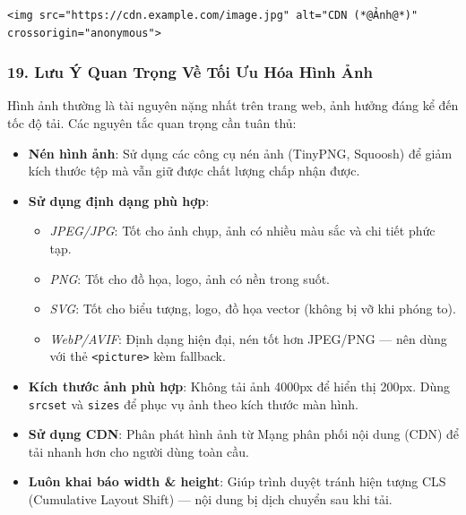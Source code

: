 \documentclass[11pt,oneside]{book}
\newcommand{\codeinline}[1]{\textcolor{accentOrange}{\texttt{#1}}}
\begin{document}
\begin{codeWindow}
\begin{lstlisting}[language=HTML5]
<img src="https://cdn.example.com/image.jpg" alt="CDN (*@Ảnh@*)" crossorigin="anonymous">
\end{lstlisting}
\end{codeWindow}

\subsubsection{19. Lưu Ý Quan Trọng Về Tối Ưu Hóa Hình Ảnh}

Hình ảnh thường là tài nguyên nặng nhất trên trang web, ảnh hưởng đáng kể đến tốc độ tải. Các nguyên tắc quan trọng cần tuân thủ:

\begin{itemize}[leftmargin=1.5em, itemsep=4pt, parsep=0pt]
    \item \textbf{Nén hình ảnh}: Sử dụng các công cụ nén ảnh (TinyPNG, Squoosh) để giảm kích thước tệp mà vẫn giữ được chất lượng chấp nhận được.
    \item \textbf{Sử dụng định dạng phù hợp}:
    \begin{itemize}[leftmargin=1.2em, itemsep=1pt, parsep=0pt]
        \item \textit{JPEG/JPG}: Tốt cho ảnh chụp, ảnh có nhiều màu sắc và chi tiết phức tạp.
        \item \textit{PNG}: Tốt cho đồ họa, logo, ảnh có nền trong suốt.
        \item \textit{SVG}: Tốt cho biểu tượng, logo, đồ họa vector (không bị vỡ khi phóng to).
        \item \textit{WebP/AVIF}: Định dạng hiện đại, nén tốt hơn JPEG/PNG — nên dùng với thẻ \codeinline{<picture>} kèm fallback.
    \end{itemize}
    \item \textbf{Kích thước ảnh phù hợp}: Không tải ảnh 4000px để hiển thị 200px. Dùng \codeinline{srcset} và \codeinline{sizes} để phục vụ ảnh theo kích thước màn hình.
    \item \textbf{Sử dụng CDN}: Phân phát hình ảnh từ Mạng phân phối nội dung (CDN) để tải nhanh hơn cho người dùng toàn cầu.
    \item \textbf{Luôn khai báo width \& height}: Giúp trình duyệt tránh hiện tượng CLS (Cumulative Layout Shift) — nội dung bị dịch chuyển sau khi tải.
\end{itemize}
\end{document}
